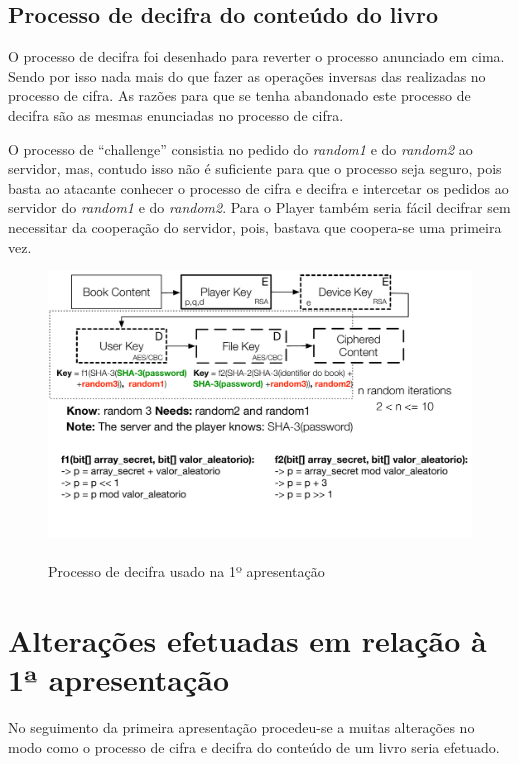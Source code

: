 \documentclass[pdftex,12pt,a4paper]{report}
\begin{document}
\subsection{Processo de decifra do conteúdo do livro}
O processo de decifra foi desenhado para reverter o processo anunciado em cima. Sendo por isso nada mais do que fazer as operações inversas das realizadas no processo de cifra. As razões para que se tenha abandonado este processo de decifra são as mesmas enunciadas no processo de cifra.

O processo de “challenge” consistia no pedido do \textit{random1} e do \textit{random2} ao servidor, mas, contudo isso não é suficiente para que o processo seja seguro, pois basta ao atacante conhecer o processo de cifra e decifra e intercetar os pedidos ao servidor do \textit{random1} e do \textit{random2}. Para o Player também seria fácil decifrar sem necessitar da cooperação do servidor, pois, bastava que coopera-se uma primeira vez.

\begin{figure}[!htb]
\center
 \includegraphics[width=135mm,scale=1]{filekey-initial-decrypt.pdf}
 \caption{\\Processo de decifra usado na 1º apresentação}\label{fig:eer}
\end{figure}

\section{Alterações efetuadas em relação à 1ª apresentação}

No seguimento da primeira apresentação procedeu-se a muitas alterações no modo como o processo de cifra e decifra do conteúdo de um livro seria efetuado.	
\end{document}
